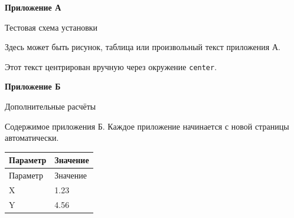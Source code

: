 \documentclass[a4paper,14pt]{extarticle}
\providecommand{\appendixblock}[2]{%
  \clearpage
  \begin{center}
    \textbf{Приложение #1}\par\vspace{4pt}
    #2
  \end{center}
  \par\vspace{6pt}
}
\providecommand{\app}[2]{\appendixblock{#1}{#2}}
\begin{document}
\app{А}{Тестовая схема установки}

Здесь может быть рисунок, таблица или произвольный текст приложения А.

\begin{center}
Этот текст центрирован вручную через окружение \texttt{center}.
\end{center}

\app{Б}{Дополнительные расчёты}

Содержимое приложения Б. Каждое приложение начинается с новой страницы
автоматически.

\begin{xltabular}{\linewidth}{|X|X|}
\hline
Параметр & Значение \\ \hline
\endfirsthead
\hline
Параметр & Значение \\ \hline
\endhead
\hline
\endfoot
\endlastfoot
X & 1.23 \\ \hline
Y & 4.56 \\ \hline
\end{xltabular}
\end{document}
